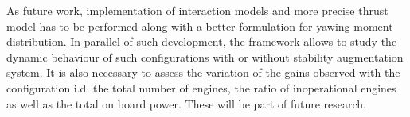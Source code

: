 As future work, implementation of interaction models and more precise thrust model has to be performed along with a better formulation for yawing moment distribution. In parallel of such development, the framework allows to study the dynamic behaviour of such configurations with or without stability augmentation system. It is also necessary to assess the variation of the gains observed with the configuration i.d. the total number of engines, the ratio of inoperational engines as well as the total on board power. These will be part of future research.



%


%
